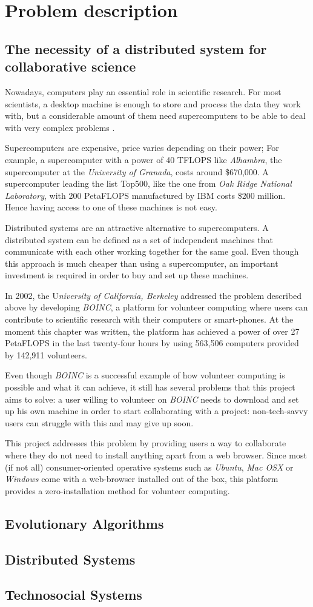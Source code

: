 \chapter{Problem description}
\section{The necessity of a distributed system for collaborative science}
Nowadays, computers play an essential role in scientific research. For most scientists, a desktop machine is enough to store and process the data they work with, but a considerable amount of them need supercomputers to be able to deal with very complex problems \cite{computing-in-science}.

Supercomputers are expensive, price varies depending on their power; For example, a supercomputer with a power of 40 TFLOPS like \textit{Alhambra}, the supercomputer at the \textit{University of Granada}, costs around \$670,000\cite{ideal-alhambra}. A supercomputer leading the list Top500,  like the one from \textit{Oak Ridge National Laboratory}, with 200 PetaFLOPS manufactured by IBM costs \$200 million\cite{oak-ridge}. Hence having access to one of these machines is not easy.

Distributed systems are an attractive alternative to supercomputers. A distributed system can be defined as a set of independent machines that communicate with each other working together for the same goal. Even though this approach is much cheaper than using a supercomputer, an important investment is required in order to buy and set up these machines.

In 2002, the U\textit{niversity of California, Berkeley} addressed the problem described above by developing \textit{BOINC}\cite{boinc-website}, a platform for volunteer computing where users can contribute to scientific research with their computers or smart-phones. At the moment this chapter was written, the platform has achieved a power of over 27 PetaFLOPS in the last twenty-four hours by using 563,506 computers provided by 142,911 volunteers.

Even though \textit{BOINC} is a successful example of how volunteer computing is possible and what it can achieve, it still has several problems that this project aims to solve: a user willing to volunteer on \textit{BOINC} needs to download and set up his own machine in order to start collaborating with a project: non-tech-savvy users can struggle with this and may give up soon.

This project addresses this problem by providing users a way to collaborate where they do not need to install anything apart from a web browser. Since most (if not all) consumer-oriented operative systems such as \textit{Ubuntu}, \textit{Mac OSX} or \textit{Windows} come with a web-browser installed out of the box, this platform provides a zero-installation method for volunteer computing.

\section{Evolutionary Algorithms}

\section{Distributed Systems}

\section{Technosocial Systems}
